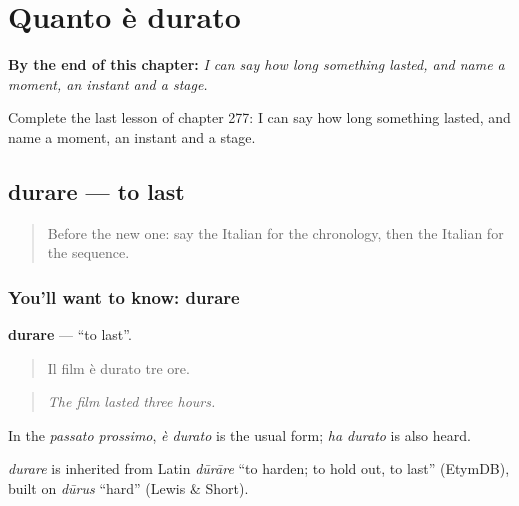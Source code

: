 
\chapter{Quanto è durato}
\label{ch:it-quanto-e-durato}

\begin{chapteropening}
\textbf{By the end of this chapter:} \emph{I can say how long something lasted, and name a moment, an instant and a stage.}

Complete the last lesson of chapter 277: I can say how long something lasted, and name a moment, an instant and a stage.
\end{chapteropening}

\section[durare]{durare — to last}

\label{lesson:IT-C277-durare}



\begin{quote}
Before the new one: say the Italian for the chronology, then the Italian for the sequence.
\end{quote}

\subsection*{You'll want to know: durare}
\textbf{durare} — \textquotedblleft{}to last\textquotedblright{}.

\begin{quote}
Il film è durato tre ore.
\end{quote}

\begin{quote}
\emph{The film lasted three hours.}
\end{quote}

In the \emph{passato prossimo}, \emph{è durato} is the usual form; \emph{ha durato} is also heard.

\begin{cousinweb}
\emph{durare} is inherited from Latin \emph{dūrāre} \textquotedblleft{}to harden; to hold out, to last\textquotedblright{} (EtymDB), built on \emph{dūrus} \textquotedblleft{}hard\textquotedblright{} (Lewis \& Short).
\end{cousinweb}

